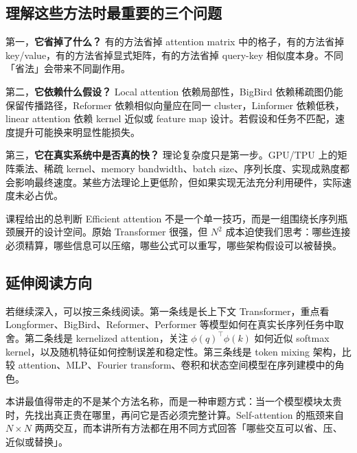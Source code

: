 \documentclass[a4paper]{article}
\begin{document}
\subsection{理解这些方法时最重要的三个问题}

第一，\textbf{它省掉了什么？} 有的方法省掉 attention matrix 中的格子，有的方法省掉 key/value，有的方法省掉显式矩阵，有的方法省掉 query-key 相似度本身。不同「省法」会带来不同副作用。

第二，\textbf{它依赖什么假设？} Local attention 依赖局部性，BigBird 依赖稀疏图仍能保留传播路径，Reformer 依赖相似向量应在同一 cluster，Linformer 依赖低秩，linear attention 依赖 kernel 近似或 feature map 设计。若假设和任务不匹配，速度提升可能换来明显性能损失。

第三，\textbf{它在真实系统中是否真的快？} 理论复杂度只是第一步。GPU/TPU 上的矩阵乘法、稀疏 kernel、memory bandwidth、batch size、序列长度、实现成熟度都会影响最终速度。某些方法理论上更低阶，但如果实现无法充分利用硬件，实际速度未必占优。

\begin{importantbox}{课程给出的总判断}
    Efficient attention 不是一个单一技巧，而是一组围绕长序列瓶颈展开的设计空间。原始 Transformer 很强，但 $N^2$ 成本迫使我们思考：哪些连接必须精算，哪些信息可以压缩，哪些公式可以重写，哪些架构假设可以被替换。
\end{importantbox}

\subsection{延伸阅读方向}

若继续深入，可以按三条线阅读。第一条线是长上下文 Transformer，重点看 Longformer、BigBird、Reformer、Performer 等模型如何在真实长序列任务中取舍。第二条线是 kernelized attention，关注 $\phi(q)^\top\phi(k)$ 如何近似 softmax kernel，以及随机特征如何控制误差和稳定性。第三条线是 token mixing 架构，比较 attention、MLP、Fourier transform、卷积和状态空间模型在序列建模中的角色。

本讲最值得带走的不是某个方法名称，而是一种审题方式：当一个模型模块太贵时，先找出真正贵在哪里，再问它是否必须完整计算。Self-attention 的瓶颈来自 $N\times N$ 两两交互，而本讲所有方法都在用不同方式回答「哪些交互可以省、压、近似或替换」。
\end{document}
